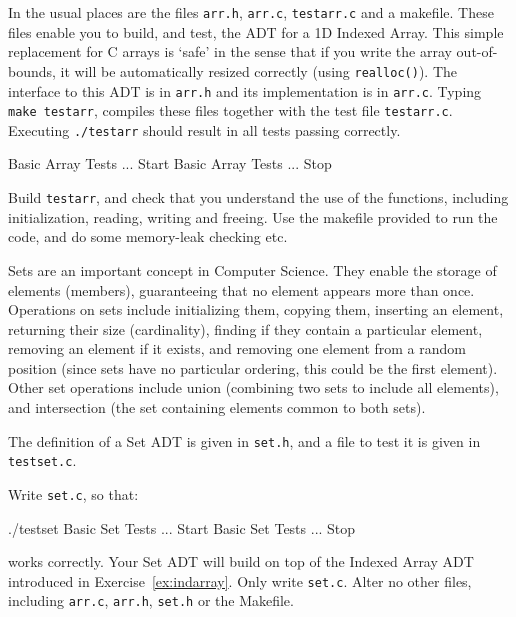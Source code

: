 
In the usual places are the files \verb^arr.h^, \verb^arr.c^, \verb^testarr.c^
and a makefile. These files enable you to build, and test, the
ADT for a 1D Indexed Array. This simple replacement for C arrays is
`safe' in the sense that if you write the array out-of-bounds, it
will be automatically resized correctly (using \verb^realloc()^). The
interface to this ADT is in \verb^arr.h^ and its implementation is in
\verb^arr.c^. Typing \verb^make testarr^, compiles these files together with the test
file \verb^testarr.c^. Executing \verb^./testarr^ should result in all
tests passing correctly.

\begin{terminaloutput}
Basic Array Tests ... Start
Basic Array Tests ... Stop
\end{terminaloutput}

\begin{exercise}
\label{ex:indarray}
Build \verb^testarr^, and check that you understand the use of the functions,
including initialization, reading, writing and freeing. Use the makefile provided to
run the code, and do some memory-leak checking etc.
\end{exercise}


Sets are an important concept in Computer Science. They enable the
storage of elements (members), guaranteeing that no element appears more than
once. Operations on sets include initializing them, copying them,
inserting an element, returning their size (cardinality), finding if
they contain a particular element, removing an element if it exists, and
removing one element from a random position (since sets have no particular
ordering, this could be the first element). Other set operations include
union (combining two sets to include all elements), and intersection
(the set containing elements common to both sets).


The definition of a Set ADT is given in \verb^set.h^, and a file to test it is given
in \verb^testset.c^.

\begin{exercise}
Write \verb^set.c^, so that:
{\small
\begin{terminaloutput}
./testset
Basic Set Tests ... Start
Basic Set Tests ... Stop
\end{terminaloutput}
}
\noindent works correctly. Your Set ADT will build on top of the Indexed Array ADT introduced in
Exercise~\ref{ex:indarray}.
Only write \verb^set.c^. Alter no other files, including \verb^arr.c^, \verb^arr.h^,
\verb^set.h^ or the Makefile.
\end{exercise}

